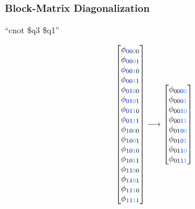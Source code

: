 \documentclass{beamer}
\begin{document}
\begin{frame}
 \frametitle{Block-Matrix Diagonalization}

``cnot \$q3 \$q1''
\begin{footnotesize}
\begin{equation}
        \begin{bmatrix} 
      \phi_{{\color{blue}0}0{\color{cyan}0}0} \\
      \phi_{{\color{blue}0}0{\color{cyan}0}1} \\
      \phi_{{\color{blue}0}0{\color{cyan}1}0}  \\
      \phi_{{\color{blue}0}0{\color{cyan}1}1} \\
      \phi_{{\color{blue}0}1{\color{cyan}0}0} \\
      \phi_{{\color{blue}0}1{\color{cyan}0}1} \\
      \phi_{{\color{blue}0}1{\color{cyan}1}0}  \\
      \phi_{{\color{blue}0}1{\color{cyan}1}1} \\
      \phi_{{\color{blue}1}0{\color{cyan}0}0} \\
      \phi_{{\color{blue}1}0{\color{cyan}0}1} \\
      \phi_{{\color{blue}1}0{\color{cyan}1}0}  \\
      \phi_{{\color{blue}1}0{\color{cyan}1}1} \\
      \phi_{{\color{blue}1}1{\color{cyan}0}0} \\
      \phi_{{\color{blue}1}1{\color{cyan}0}1} \\
      \phi_{{\color{blue}1}1{\color{cyan}1}0}  \\
      \phi_{{\color{blue}1}1{\color{cyan}1}1} \\
    \end{bmatrix} 
  \longrightarrow
     \begin{bmatrix} 
      \phi_{00{\color{blue}0}{\color{cyan}0}} \\
      \phi_{00{\color{blue}0}{\color{cyan}1}} \\
      \phi_{00{\color{blue}1}{\color{cyan}0}}  \\
      \phi_{00{\color{blue}1}{\color{cyan}1}} \\
      \phi_{01{\color{blue}0}{\color{cyan}0}} \\
      \phi_{01{\color{blue}0}{\color{cyan}1}} \\
      \phi_{01{\color{blue}1}{\color{cyan}0}}  \\
      \phi_{01{\color{blue}1}{\color{cyan}1}} \\

\end{bmatrix}
\end{equation}
\end{footnotesize}
\end{frame}
\end{document}
